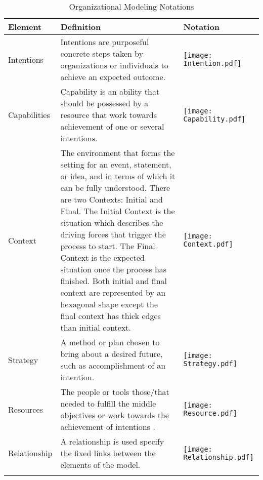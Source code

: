 \begin{center}
	\begin{longtable}{p{3cm}p{10cm}p{3cm}}
		\toprule 
		\textbf{Element} & \textbf{Definition} & \textbf{Notation} \\
		\midrule
		\endfirsthead
		Intentions 			& Intentions are purposeful concrete steps taken by organizations or individuals to achieve an expected outcome. & \begin{center} \texttt{[image: Intention.pdf]}  \end{center}  \\
		
		Capabilities	&  Capability is an ability that should be possessed by a resource that work towards achievement of one or several intentions.   & \begin{center} \texttt{[image: Capability.pdf]} \end{center}  \\
		
		Context				& The environment that forms the setting for an event, statement, or idea, and in terms of which it can be fully understood. There are two Contexts: Initial and Final. The Initial Context is the situation which describes the driving forces that trigger the process to start. The Final Context is the expected situation once the process has finished. Both initial and final context are represented by an hexagonal shape except the final context has thick edges than initial context.  & \begin{center} \texttt{[image: Context.pdf]} \end{center}   \\
			
		Strategy		&  A method or plan chosen to bring about a desired future, such as accomplishment of an intention.   & \begin{center} \texttt{[image: Strategy.pdf]} \end{center}  \\
		
		Resources					& The people or tools those/that needed to fulfill the middle objectives or work towards the achievement of intentions . & \begin{center} \texttt{[image: Resource.pdf]} \end{center}  \\
		
		Relationship				& A relationship is used specify the fixed links between the elements of the model.  & \begin{center} \texttt{[image: Relationship.pdf]} \end{center}   \\
		
		\bottomrule
		\caption{Organizational Modeling Notations}
		\label{tab:notations}		
	\end{longtable}	
\end{center}


